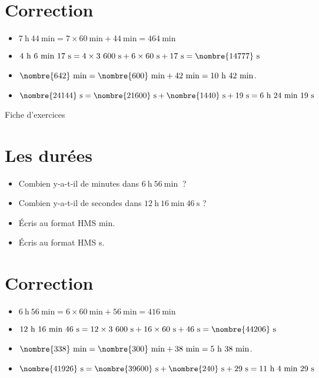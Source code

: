\documentclass[a4paper,11pt,fleqn]{article}
\begin{document}
\section{Correction}
\begin{itemize}
 \item $7~\text{h}~44~\text{min}=7\times60~\text{min}+44~\text{min}=464~\text{min}$
  \item $4~\text{h}~6~\text{min}~17~\text{s}=4\times3~600~\text{s}+6\times60~\text{s}+17~\text{s}=\nombre{14777}~\text{s}$
  \item $\nombre{642}~\text{min}=\nombre{600}~\text{min}+42~\text{min}=10~\text{h}~42~\text{min}$.
  \item $\nombre{24144}~\text{s}=\nombre{21600}~\text{s}+\nombre{1440}~\text{s}+19~\text{s}=6~\text{h}~24~\text{min}~19~\text{s}$ \end{itemize}


\newpage
\setcounter{exo}{0}
\setcounter{section}{0}
\begin{center}
	{\huge Fiche d'exercices } 	
\end{center}


\section{Les durées}
\begin{itemize}
  \item Combien y-a-t-il de minutes dans $6~\text{h}~56~\text{min}~$ ?
  \item Combien y-a-t-il de secondes dans $12~\text{h}~16~\text{min}~46~\text{s}$ ?
  \item Écris au format HMS  min.
  \item Écris au format HMS  s.
\end{itemize}

\section{Correction}
\begin{itemize}
 \item $6~\text{h}~56~\text{min}=6\times60~\text{min}+56~\text{min}=416~\text{min}$
  \item $12~\text{h}~16~\text{min}~46~\text{s}=12\times3~600~\text{s}+16\times60~\text{s}+46~\text{s}=\nombre{44206}~\text{s}$
  \item $\nombre{338}~\text{min}=\nombre{300}~\text{min}+38~\text{min}=5~\text{h}~38~\text{min}$.
  \item $\nombre{41926}~\text{s}=\nombre{39600}~\text{s}+\nombre{240}~\text{s}+29~\text{s}=11~\text{h}~4~\text{min}~29~\text{s}$ \end{itemize}
\end{document}
